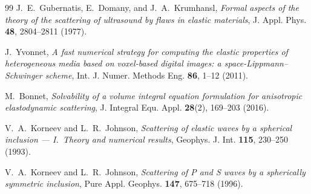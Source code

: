 \documentclass[11pt,a4paper]{article}
\begin{document}
\begin{thebibliography}{99}
J.~E.~Gubernatis, E.~Domany, and J.~A.~Krumhansl,
\emph{Formal aspects of the theory of the scattering of ultrasound
by flaws in elastic materials},
J. Appl. Phys. \textbf{48}, 2804--2811 (1977).

J.~Yvonnet,
\emph{A fast numerical strategy for computing the elastic properties
of heterogeneous media based on voxel-based digital images: a
space-Lippmann--Schwinger scheme},
Int. J. Numer. Methods Eng. \textbf{86}, 1--12 (2011).

M.~Bonnet,
\emph{Solvability of a volume integral equation formulation for
anisotropic elastodynamic scattering},
J. Integral Equ. Appl. \textbf{28}(2), 169--203 (2016).

V.~A.~Korneev and L.~R.~Johnson,
\emph{Scattering of elastic waves by a spherical inclusion --- I.\
Theory and numerical results},
Geophys. J. Int. \textbf{115}, 230--250 (1993).

V.~A.~Korneev and L.~R.~Johnson,
\emph{Scattering of P and S waves by a spherically symmetric inclusion},
Pure Appl. Geophys. \textbf{147}, 675--718 (1996).

\end{thebibliography}
\end{document}
